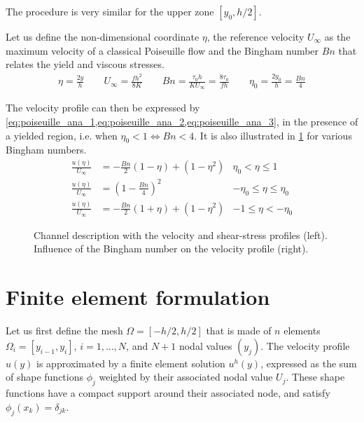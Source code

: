 \documentclass[11 pt]{report}
\begin{document}
The procedure is very similar for the upper zone $[y_0, h/2]$.

Let us define the non-dimensional coordinate $\eta$, the reference velocity $U_{\infty}$ as the maximum velocity of a classical Poiseuille flow and the Bingham number $Bn$ that relates the yield and viscous stresses.
\begin{align}
    \eta=\frac{2y}{h} \qquad U_{\infty}= \frac{f h^2}{8K} \qquad Bn=\frac{\tau_0 h}{K U_{\infty}}=\frac{8\tau_0}{f h} \qquad \eta_0 = \frac{2y_0}{h} = \frac{Bn}{4}
\end{align}

The velocity profile can then be expressed by \cref{eq:poiseuille_ana_1,eq:poiseuille_ana_2,eq:poiseuille_ana_3}, in the presence of a yielded region, i.e. when $\eta_0 < 1 \iff Bn < 4$. It is also illustrated in \cref{fig:1D_situation} for various Bingham numbers.
\begin{align}
    \frac{u(\eta)}{U_{\infty}} &= -\frac{Bn}{2}(1-\eta) + (1-\eta^2) & \eta_0 < \eta \leq 1 \label{eq:poiseuille_ana_1}\\
    \frac{u(\eta)}{U_{\infty}} &= \left(1 - \frac{Bn}{4} \right)^2 & -\eta_0 \leq \eta \leq \eta_0 \label{eq:poiseuille_ana_2}\\
    \frac{u(\eta)}{U_{\infty}} &= -\frac{Bn}{2}(1+\eta) + (1-\eta^2) & -1 \leq \eta < -\eta_0 \label{eq:poiseuille_ana_3}
\end{align}

\begin{figure}
    \centering
    \begin{subfigure}[b]{0.41\textwidth}
        
        \vspace{15pt}
    \end{subfigure}
    \begin{subfigure}[b]{0.58\textwidth}
        
    \end{subfigure}
    \caption{Channel description with the velocity and shear-stress profiles (left). Influence of the Bingham number on the velocity profile (right).} 
    \label{fig:1D_situation}
\end{figure}


\section{Finite element formulation}

Let us first define the mesh $\Omega=[-h/2, h/2]$ that is made of $n$ elements $\Omega_i=[y_{i-1}, y_i]$, $i=1, \dots, N$, and $N+1$ nodal values $(y_j)$. The velocity profile $u(y)$ is approximated by a finite element solution $u^h(y)$, expressed as the sum of shape functions $\phi_j$ weighted by their associated nodal value $U_j$. These shape functions have a compact support around their associated node, and satisfy $\phi_j(x_k) = \delta_{jk}$.
\end{document}
